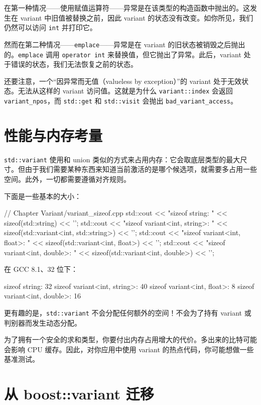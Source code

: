 在第一种情况——使用赋值运算符——异常是在该类型的构造函数中抛出的。这发生在 variant 中旧值被替换之前，因此 variant 的状态没有改变。如你所见，我们仍然可以访问 \texttt{int} 并打印它。

然而在第二种情况——\texttt{emplace}——异常是在 variant 的旧状态被销毁之后抛出的。\texttt{emplace} 调用 \texttt{operator int} 来替换值，但它抛出了异常。此后，variant 处于错误的状态，我们无法恢复之前的状态。

还要注意，一个“因异常而无值（valueless by exception）”的 variant 处于无效状态。无法从这样的 variant 访问值。这就是为什么 \texttt{variant::index} 会返回 \texttt{variant\_npos}，而 \texttt{std::get} 和 \texttt{std::visit} 会抛出 \texttt{bad\_variant\_access}。

\section{性能与内存考量}

\texttt{std::variant} 使用和 union 类似的方式来占用内存：它会取底层类型的最大尺寸。但由于我们需要某种东西来知道当前激活的是哪个候选项，就需要多占用一些空间。此外，一切都需要遵循对齐规则。

下面是一些基本的大小：

\begin{codebox}[cpp]
// Chapter Variant/variant_sizeof.cpp
std::cout << "sizeof string: "
<< sizeof(std::string) << '\n';
std::cout << "sizeof variant<int, string>: "
<< sizeof(std::variant<int, std::string>) << '\n';
std::cout << "sizeof variant<int, float>: "
<< sizeof(std::variant<int, float>) << '\n';
std::cout << "sizeof variant<int, double>: "
<< sizeof(std::variant<int, double>) << '\n';
\end{codebox}

在 GCC 8.1、32 位下：

\begin{codebox}
sizeof string: 32
sizeof variant<int, string>: 40
sizeof variant<int, float>: 8
sizeof variant<int, double>: 16
\end{codebox}

更有趣的是，\texttt{std::variant} 不会分配任何额外的空间！不会为了持有 variant 或判别器而发生动态分配。

为了拥有一个安全的求和类型，你要付出内存占用增大的代价。多出来的比特可能会影响 CPU 缓存。因此，对你应用中使用 variant 的热点代码，你可能想做一些基准测试。

\section{从 boost::variant 迁移}

